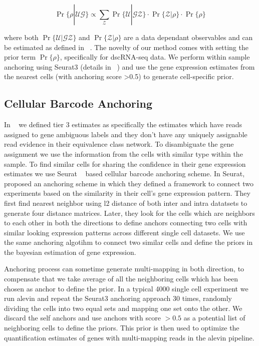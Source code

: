 \begin{equation}
	\Pr \{ \rho | \mathcal{U} \mathcal{G} \} 
	\propto \sum_{\mathcal{Z}} \Pr\{ \mathcal{U} | \mathcal{G} \mathcal{Z} \}
	\cdot \Pr\{ \mathcal{Z} | \rho \} \cdot \Pr\{ \rho \}
\end{equation}

where both $\Pr\{ \mathcal{U} | \mathcal{G} \mathcal{Z} \}$ and $\Pr\{ \mathcal{Z} | \rho \}$ are 
a data dependant observables and can be estimated as defined in ~\citet{salmon}. The novelty of our method
comes with setting the prior term $\Pr\{ \rho \}$, specifically for dscRNA-seq data. We perform
within sample anchoring using Seurat3 (details in ~) and use the gene expression
estimates from the nearest cells (with anchoring score >0.5) to generate cell-specific prior.

\subsection{Cellular Barcode Anchoring}
\label{subsec:anchor}
In ~ we defined tier 3 estimates as specifically the estimates which have reads assigned 
to gene ambiguous labels and they don't have any uniquely assignable read evidence in their equivalence 
class network. To disambiguate the gene assignment we use the 
information from the cells with similar type within the sample. To find similar cells for sharing 
the confidence in their gene expression estimates we use Seurat ~\citep{seurat3} based cellular
barcode anchoring scheme. In Seurat, ~\citet{seurat3} proposed an anchoring scheme in which they 
defined a framework to connect two experiments based on the similarity in their cell's gene expression 
pattern. They first find nearest neighbor using l2 distance of both inter and intra datatsets to generate 
four distance matrices. Later, they look for the cells which are neighbors to each other in both 
the directions to define anchors connecting two cells with similar looking expression patterns 
across different single cell datasets. We use the same anchoring algotihm to connect two similar 
cells and define the priors in the bayesian estimation of gene expression.

Anchoring process can sometime generate multi-mapping in both direction, to compensate that we take average 
of all the neighboring cells which has been chosen as anchor to define the prior. In a typical 4000 single 
cell experiment we run alevin and repeat the Seurat3 anchoring approach $30$ times, randomly dividing 
the cells into two equal sets and mapping one set onto the other. We discard the self anchors and use 
anchors with score $>0.5$ as a potential list of neighboring cells to define the priors. This prior 
is then used to optimize the quantification estimates of genes with multi-mapping reads in the alevin 
pipeline.

